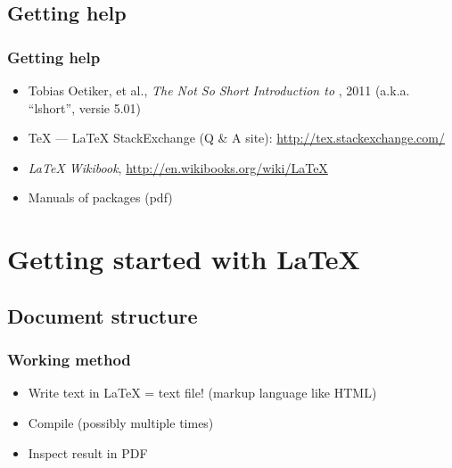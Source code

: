 \documentclass[aspectratio=169]{beamer}
\begin{document}
\subsection{Getting help}

\begin{frame}
  \frametitle{Getting help}

  \begin{itemize}
    \item Tobias Oetiker, et al., \emph{The Not So Short Introduction to {\LaTeXe}}, 2011 (a.k.a. ``lshort'', versie 5.01)
    \item {\TeX} --- {\LaTeX} StackExchange (Q \& A site): \url{http://tex.stackexchange.com/}
    \item \emph{{\LaTeX} Wikibook}, \url{http://en.wikibooks.org/wiki/LaTeX}
    \item Manuals of packages (pdf)
  \end{itemize}

\end{frame}

\section{Getting started with {\LaTeX}}

\subsection{Document structure}

\begin{frame}
  \frametitle{Working method}

  \begin{itemize}
    \item<+-> Write text in  {\LaTeX}
    = text file! (markup language like HTML)
    \item<+-> Compile (possibly multiple times)
    \item<+-> Inspect result in PDF
  \end{itemize}
\end{frame}
\end{document}
